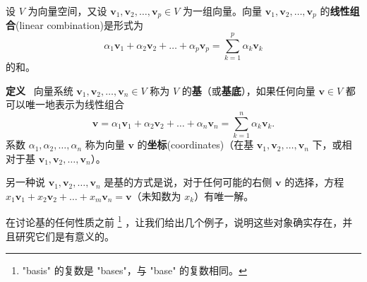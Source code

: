 设 $V$ 为向量空间，又设 $\mathbf{v}_1, \mathbf{v}_2, \dots, \mathbf{v}_p \in V$ 为一组向量。向量 $\mathbf{v}_1, \mathbf{v}_2, \dots, \mathbf{v}_p$ 的\textbf{线性组合}(linear combination)是形式为
$$
\alpha_1 \mathbf{v}_1 + \alpha_2 \mathbf{v}_2 + \dots + \alpha_p \mathbf{v}_p = \sum_{k=1}^p \alpha_k \mathbf{v}_k
$$
的和。

\textbf{定义}~ 向量系统 $\mathbf{v}_1, \mathbf{v}_2, \dots, \mathbf{v}_n \in V$ 称为 $V$ 的\textbf{基}（或\textbf{基底}），如果任何向量 $\mathbf{v} \in V$ 都可以唯一地表示为线性组合
$$
\mathbf{v} = \alpha_1 \mathbf{v}_1 + \alpha_2 \mathbf{v}_2 + \dots + \alpha_n \mathbf{v}_n = \sum_{k=1}^n \alpha_k \mathbf{v}_k.
$$
系数 $\alpha_1, \alpha_2, \dots, \alpha_n$ 称为向量 $\mathbf{v}$ 的\textbf{坐标}(coordinates)（在基 $\mathbf{v}_1, \mathbf{v}_2, \dots, \mathbf{v}_n$ 下，或相对于基 $\mathbf{v}_1, \mathbf{v}_2, \dots, \mathbf{v}_n$）。

另一种说 $\mathbf{v}_1, \mathbf{v}_2, \dots, \mathbf{v}_n$ 是基的方式是说，对于任何可能的右侧 $\mathbf{v}$ 的选择，方程 $x_1 \mathbf{v}_1 + x_2 \mathbf{v}_2 + \dots + x_m \mathbf{v}_n = \mathbf{v}$（未知数为 $x_k$）有唯一解。

在讨论基的任何性质之前
\footnote{
"basis" 的复数是 "bases"，与 "base" 的复数相同。
}
，让我们给出几个例子，说明这些对象确实存在，并且研究它们是有意义的。


